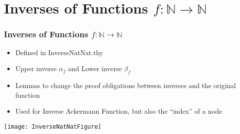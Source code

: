 \section{Inverses of Functions $f: \mathbb{N} \rightarrow \mathbb{N}$}
\begin{frame}
	\frametitle{Inverses of Functions $f: \mathbb{N} \rightarrow \mathbb{N}$}
	\begin{minipage}[t]{0.55\linewidth}
		\vspace{-4cm}
	\begin{itemize}
		\item Defined in InverseNatNat.thy
		\item Upper inverse $\alpha_f$ and Lower inverse $\beta_f$
		\item Lemmas to change the proof obligations between inverses and the original function
		\item Used for Inverse Ackermann Function, but also the ``index'' of a node
	\end{itemize}
	\end{minipage}
\begin{minipage}[c]{0.4\linewidth}
\texttt{[image: InverseNatNatFigure]}
\end{minipage}
\end{frame}


